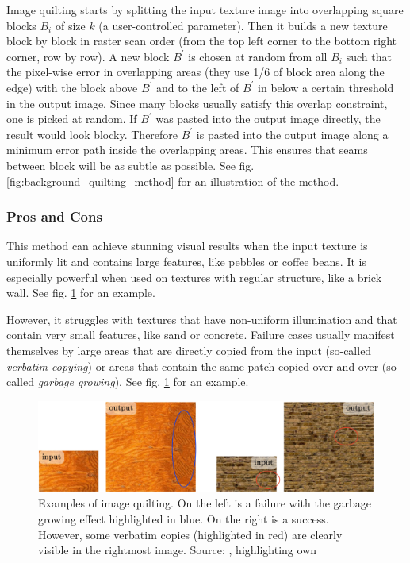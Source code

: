 Image quilting starts by splitting the input texture image into overlapping square blocks \(B_i\) of size \(k\) (a user-controlled parameter). Then it builds a new texture block by block in raster scan order (from the top left corner to the bottom right corner, row by row). A new block \(B^{\prime}\) is chosen at random from all \(B_i\) such that the pixel-wise error in overlapping areas (they use 1/6 of block area along the edge) with the block above \(B^{\prime}\) and to the left of \(B^{\prime}\) in below a certain threshold in the output image. Since many blocks usually satisfy this overlap constraint, one is picked at random. If \(B^{\prime}\) was pasted into the output image directly, the result would look blocky. Therefore \(B^{\prime}\) is pasted into the output image along a minimum error path inside the overlapping areas. This ensures that seams between block will be as subtle as possible. See fig. \ref{fig:background_quilting_method} for an illustration of the method.

\subsubsection{Pros and Cons}
\label{section:background-texture_synthesis-patch_based-pros_and_cons}

This method can achieve stunning visual results when the input texture is uniformly lit and contains large features, like pebbles or coffee beans. It is especially powerful when used on textures with regular structure, like a brick wall. See fig. \ref{fig:background_quilting_pros_cons} for an example.

However, it struggles with textures that have non-uniform illumination and that contain very small features, like sand or concrete. Failure cases usually manifest themselves by large areas that are directly copied from the input (so-called \textit{verbatim copying}) or areas that contain the same patch copied over and over (so-called \textit{garbage growing}). See fig. \ref{fig:background_quilting_pros_cons} for an example.

\begin{figure}[ht]
    \centering
    \includegraphics[width=\textwidth]{images/02-quilting_pros_cons_compressed.jpg}
    \caption{Examples of image quilting. On the left is a failure with the garbage growing effect highlighted in blue. On the right is a success. However, some verbatim copies (highlighted in red) are clearly visible in the rightmost image. Source: \citet{Raad2018}, highlighting own}
    \label{fig:background_quilting_pros_cons}
\end{figure}

